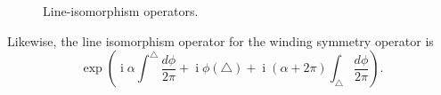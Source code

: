 \documentclass[
  letterpaper,
  DIV=11,
  numbers=noendperiod]{scrreport}
\DeclareMathOperator{\imunit}{i}
\begin{document}
\begin{figure}

\begin{minipage}[t]{0.50\linewidth}

{\centering 


}

\end{minipage}%
%
\begin{minipage}[t]{0.50\linewidth}

{\centering 


}

\end{minipage}%

\caption{\label{fig-line-isom}Line-isomorphism operators.}

\end{figure}

Likewise, the line isomorphism operator for the winding symmetry
operator is \[
 \exp\left(\imunit \alpha \int^{\triangle} \frac{d\phi}{2\pi} + \imunit\phi(\triangle)  + \imunit (\alpha+2\pi)  \int_{\triangle} \frac{d\phi}{2\pi}  \right).
\]
\end{document}

